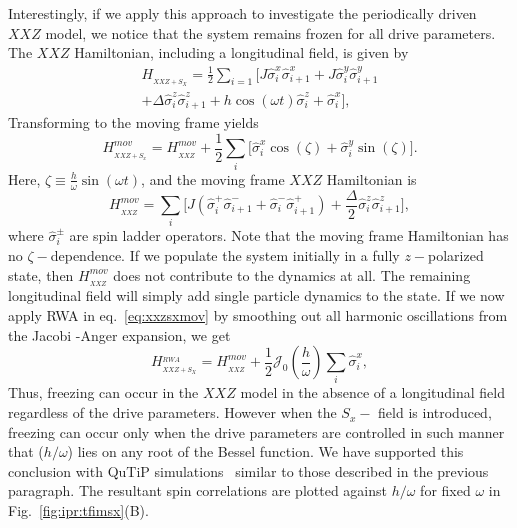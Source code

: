 \documentclass[%
reprint,
superscriptaddress,
amsmath,amssymb,
aps,
prb,
showkeys,
]{revtex4-2}
\begin{document}
Interestingly, if we apply this approach to investigate the periodically driven $XXZ$ model, we notice that the system remains frozen for all drive parameters. The $XXZ$ Hamiltonian, including a longitudinal field, is given by
\begin{multline}
	H_{_{XXZ+S_{X}}} = \frac12 \sum_{i=1} \bigg[ J \hat{\sigma}^x_i \hat{\sigma}^x_{i+1} +J  \hat{\sigma}^y_i \hat{\sigma}^y_{i+1}\\ + \Delta  \hat{\sigma}^z_i \hat{\sigma}^z_{i+1} + h\cos(\omega t)  \hat{\sigma}^z_i + \hat{\sigma}^x_i\bigg],
	\label{eq:xxzsx}
\end{multline}
Transforming to the moving frame  yields
\begin{equation}
H_{_{XXZ+S_{x}}}^{mov} =H_{_{XXZ}}^{mov} +  \frac12 \sum_i\Big[ \hat{\sigma}^x_i \cos(\zeta) + \hat{\sigma}^y_i \sin(\zeta)\Big].
\label{eq:xxzsxmov}
\end{equation}
Here, $\zeta \equiv \frac{h}{\omega}\sin(\omega t)$, and the moving frame $XXZ$ Hamiltonian is
\begin{equation}
H_{_{XXZ}}^{mov} =  \sum_i\Bigg[J\left(\hat{\sigma}^+_i \hat{\sigma}^-_{i+1} + \hat{\sigma}^-_i \hat{\sigma}^+_{i+1}\right) + \frac{\Delta}{2} \hat{\sigma}^z_i \hat{\sigma}^z_{i+1}\Bigg],
\end{equation}
where $\hat{\sigma}^\pm_i$ are spin ladder operators. Note that the moving frame Hamiltonian has no $\zeta-$dependence. If we populate the system initially in a  fully $z-$polarized state, then $H_{_{XXZ}}^{mov}$ does not contribute to the dynamics at all. The remaining longitudinal field  will simply add single particle dynamics to the state. If we now apply RWA in eq.~\ref{eq:xxzsxmov} by smoothing out all harmonic oscillations from the Jacobi -Anger expansion, we get
\begin{equation}
H_{_{XXZ+S_{X}}}^{_{RWA}} = H_{_{XXZ}}^{mov} +  \frac12 \mathcal{J}_0 \left(\frac{h}{\omega}\right)\sum_i \hat{\sigma}^x_i,
\label{eq:xxz_sx_rwa}
\end{equation}
Thus, freezing can occur in the $XXZ$ model in the absence of a longitudinal field regardless of the drive parameters. However when the $S_x-$ field is introduced, freezing can occur only when the drive parameters are controlled in such manner that ($h/\omega$) lies on any root of the Bessel function. We have supported this conclusion with QuTiP simulations~\cite{qutip} similar to those described in the previous paragraph. The resultant spin correlations are plotted against $h/\omega$ for fixed $\omega$ in Fig.~\ref{fig:ipr:tfimsx}(B). 
\end{document}
